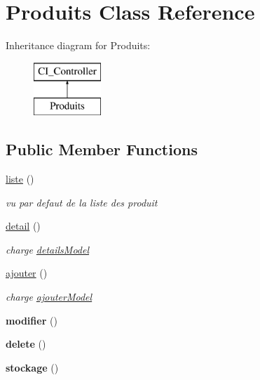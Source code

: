 \hypertarget{class_produits}{}\section{Produits Class Reference}
\label{class_produits}
Inheritance diagram for Produits\+:\begin{figure}[H]
\begin{center}
\leavevmode
\includegraphics[height=2.000000cm]{class_produits}
\end{center}
\end{figure}
\subsection*{Public Member Functions}
\begin{DoxyCompactItemize}
\item 
\mbox{\hyperlink{class_produits_af76bee9668cf04b282e28df92cd187b5}{liste}} ()
\begin{DoxyCompactList}\small\item\em vu par defaut de la liste des produit \end{DoxyCompactList}\item 
\mbox{\hyperlink{class_produits_a4e56360e0b1070f0bb23c583b259acff}{detail}} ()
\begin{DoxyCompactList}\small\item\em charge \mbox{\hyperlink{classdetails_model}{details\+Model}} \end{DoxyCompactList}\item 
\mbox{\hyperlink{class_produits_a0105653ba10d413c43d8d31194fa1c4a}{ajouter}} ()
\begin{DoxyCompactList}\small\item\em charge \mbox{\hyperlink{classajouter_model}{ajouter\+Model}} \end{DoxyCompactList}\item 
\mbox{\label{class_produits_a01fc1752d9fb5c437fbb194a87510145}} 
{\bfseries modifier} ()
\item 
\mbox{\label{class_produits_afc53b7f1b519a88c42934bac7b1645a0}} 
{\bfseries delete} ()
\item 
\mbox{\label{class_produits_a0e0aeb50cc39f5dfe4faa9dbf2a4b3be}} 
{\bfseries stockage} ()
\end{DoxyCompactItemize}
